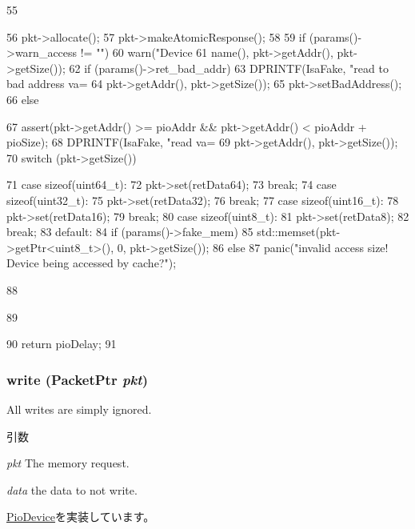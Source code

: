 \begin{DoxyCode}
55 {
56     pkt->allocate();
57     pkt->makeAtomicResponse();
58 
59     if (params()->warn_access != "")
60         warn("Device %
61                 name(), pkt->getAddr(), pkt->getSize());
62     if (params()->ret_bad_addr) {
63         DPRINTF(IsaFake, "read to bad address va=%
64                 pkt->getAddr(), pkt->getSize());
65         pkt->setBadAddress();
66     } else {
67         assert(pkt->getAddr() >= pioAddr && pkt->getAddr() < pioAddr + pioSize);
68         DPRINTF(IsaFake, "read  va=%
69                 pkt->getAddr(), pkt->getSize());
70         switch (pkt->getSize()) {
71           case sizeof(uint64_t):
72              pkt->set(retData64);
73              break;
74           case sizeof(uint32_t):
75              pkt->set(retData32);
76              break;
77           case sizeof(uint16_t):
78              pkt->set(retData16);
79              break;
80           case sizeof(uint8_t):
81              pkt->set(retData8);
82              break;
83           default:
84              if (params()->fake_mem)
85                  std::memset(pkt->getPtr<uint8_t>(), 0, pkt->getSize());
86              else
87                  panic("invalid access size! Device being accessed by cache?\n");
      
88         }
89     }
90     return pioDelay;
91 }
\end{DoxyCode}
\hypertarget{classIsaFake_a4cefab464e72b5dd42c003a0a4341802}{
\subsubsection[{write}]{ write ({\bf PacketPtr} {\em pkt})}}
\label{classIsaFake_a4cefab464e72b5dd42c003a0a4341802}
All writes are simply ignored. 
\begin{DoxyParams}{引数}
\item[{\em pkt}]The memory request. \item[{\em data}]the data to not write. \end{DoxyParams}


\hyperlink{classPioDevice_afe8371668d023bb2516b286e5e399b6f}{PioDevice}を実装しています。


